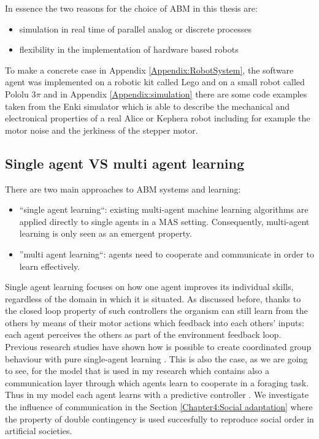 In essence the two reasons for the choice of ABM in this thesis are:
\begin{itemize}
 \item simulation in real time of parallel analog or discrete processes
 \item flexibility in the implementation of hardware based robots
\end{itemize}
To make a concrete case in Appendix \ref{Appendix:RobotSystem}, the software agent 
was implemented on a robotic kit called Lego and on a small robot called Pololu $3 \pi$ 
and in Appendix \ref{Appendix:simulation} there are some code examples taken from
 the Enki simulator which is able to describe the mechanical and electronical properties
 of a real Alice  or Kephera robot 
 including for example the motor noise and the jerkiness 
of the stepper motor.



\subsection{Single agent VS multi agent learning}
There are two main approaches to ABM systems and learning:
\begin{itemize}
 \item ``single agent learning``: existing multi-agent machine learning algorithms are applied
directly to single agents in a MAS setting. Consequently, multi-agent learning is only
seen as an emergent property.
\item ''multi agent learning``: agents need to cooperate and communicate in order
to learn effectively.
\end{itemize}

Single agent learning \citep{StoneVeloso98:RoboCup,Porr2006ICO,Porr2003b} 
focuses on how one agent improves
its individual skills, regardless of the domain in which it is situated.
As discussed before, thanks to the closed loop property of such controllers the 
organism can still learn from the others by means of their motor actions which 
feedback into each others' inputs: each agent perceives the others as part of the environment feedback loop.
Previous research studies have shown how is possible to create  coordinated group behaviour 
with pure single-agent learning \citep{Sugawara98learningto}.
This is also the case, as we are going to see, for the model that is used in my research which
contains also a communication layer through which agents learn to cooperate in a foraging task.
Thus in my model each agent learns with a predictive controller \citep{Porr2006ICO}.
We investigate the influence of communication in the Section \ref{Chapter4:Social adaptation} 
where the property of double contingency is used succesfully to reproduce social order
 in artificial societies.


